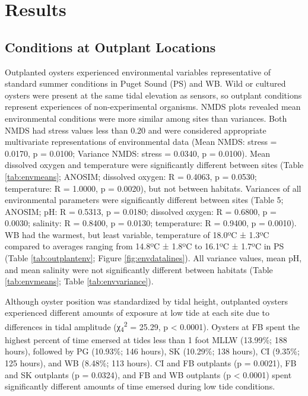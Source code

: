 \documentclass [11pt, proquest] {uwthesis}[2015/03/03]
\begin{document}
\hypertarget{results}{%
\section{Results}\label{results}}

\hypertarget{conditions-at-outplant-locations}{%
\subsection{Conditions at Outplant Locations}\label{conditions-at-outplant-locations}}

Outplanted oysters experienced environmental variables representative of standard summer conditions in Puget Sound (PS) and WB. Wild or cultured oysters were present at the same tidal elevation as sensors, so outplant conditions represent experiences of non-experimental organisms. NMDS plots revealed mean environmental conditions were more similar among sites than variances. Both NMDS had stress values less than 0.20 and were considered appropriate multivariate representations of environmental data (Mean NMDS: stress = 0.0170, p = 0.0100; Variance NMDS: stress = 0.0340, p = 0.0100). Mean dissolved oxygen and temperature were significantly different between sites (Table \ref{tab:envmeans}; ANOSIM; dissolved oxygen: R = 0.4063, p = 0.0530; temperature: R = 1.0000, p = 0.0020), but not between habitats. Variances of all environmental parameters were significantly different between sites (Table 5; ANOSIM; pH: R = 0.5313, p = 0.0180; dissolved oxygen: R = 0.6800, p = 0.0030; salinity: R = 0.8400, p = 0.0130; temperature: R = 0.9400, p = 0.0010). WB had the warmest, but least variable, temperature of 18.0ºC ± 1.3ºC compared to averages ranging from 14.8ºC ± 1.8ºC to 16.1ºC ± 1.7ºC in PS (Table \ref{tab:outplantenv}; Figure \ref{fig:envdatalines}). All variance values, mean pH, and mean salinity were not significantly different between habitats (Table \ref{tab:envmeans}; Table \ref{tab:envvariance}).

Although oyster position was standardized by tidal height, outplanted oysters experienced different amounts of exposure at low tide at each site due to differences in tidal amplitude (χ\textsubscript{4}\textsuperscript{2} = 25.29, p \textless{} 0.0001). Oysters at FB spent the highest percent of time emersed at tides less than 1 foot MLLW (13.99\%; 188 hours), followed by PG (10.93\%; 146 hours), SK (10.29\%; 138 hours), CI (9.35\%; 125 hours), and WB (8.48\%; 113 hours). CI and FB outplants (p = 0.0021), FB and SK outplants (p = 0.0324), and FB and WB outplants (p \textless{} 0.0001) spent significantly different amounts of time emersed during low tide conditions.
\end{document}
